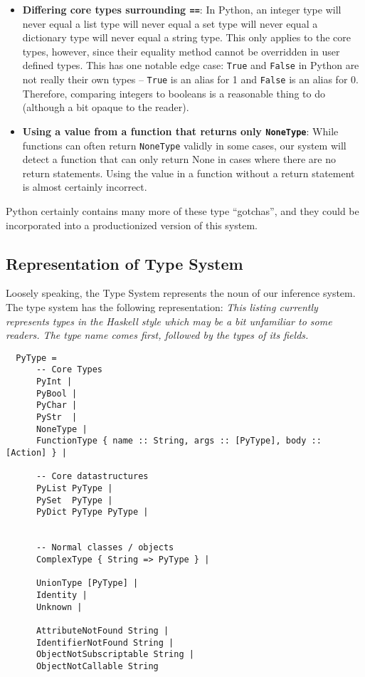 \documentclass{article}[12pt]
\begin{document}
\begin{itemize}
    \item \textbf{Differing core types surrounding \texttt{==}}: In Python, an integer type will never
          equal a list type will never equal a set type will never equal a dictionary type will
          never equal a string type. This only applies to the core types, however, since their
          equality method cannot be overridden in user defined types. This has one notable edge case: \texttt{True} and
          \texttt{False} in
          Python are not really their own types -- \texttt{True} is an alias for 1 and
          \texttt{False} is an alias for 0. Therefore, comparing integers to booleans is a
          reasonable thing to do (although a bit opaque to the reader).

      \item \textbf{Using a value from a function that returns only \texttt{NoneType}}: While functions can often
          return \texttt{NoneType} validly in some cases, our system will detect a function that can only
          return None in cases where there are no return statements. Using the value in a function
          without a return statement is almost certainly incorrect.
\end{itemize}

Python certainly contains many more of these type ``gotchas'', and they could be incorporated into a
productionized version of this system.

\subsection{Representation of Type System} 

Loosely speaking, the Type System represents the noun of our inference system. The type system has
the following representation:
\emph{This listing currently represents types in the Haskell style which may be a bit unfamiliar to
some readers. The type name comes first, followed by the types of its fields.}
\begin{verbatim}
  PyType = 
      -- Core Types
      PyInt | 
      PyBool | 
      PyChar |
      PyStr  |
      NoneType |
      FunctionType { name :: String, args :: [PyType], body :: [Action] } | 

      -- Core datastructures
      PyList PyType | 
      PySet  PyType |
      PyDict PyType PyType | 


      -- Normal classes / objects
      ComplexType { String => PyType } | 

      UnionType [PyType] | 
      Identity |
      Unknown |

      AttributeNotFound String |
      IdentifierNotFound String |
      ObjectNotSubscriptable String |
      ObjectNotCallable String 
\end{verbatim}
\end{document}
